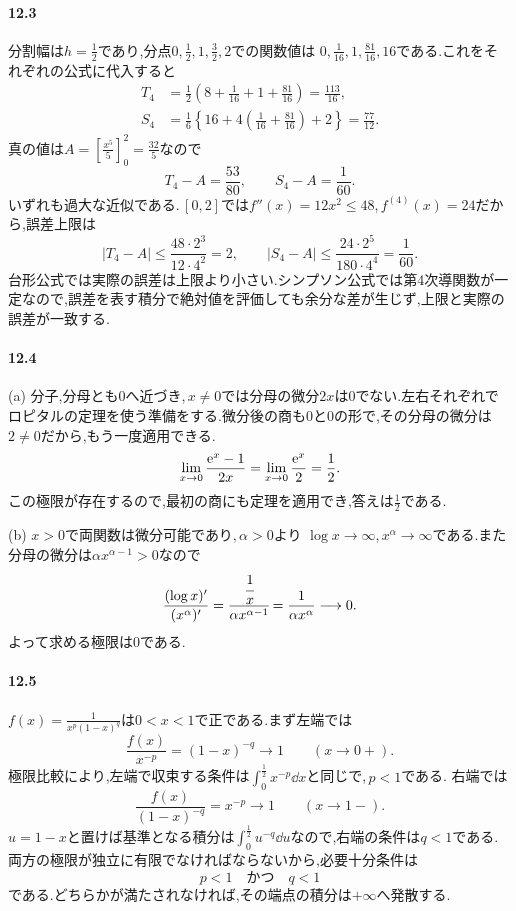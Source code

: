 \paragraph{12.3}
分割幅は$h=\frac12$であり,分点$0,\frac12,1,\frac32,2$での関数値は
$0,\frac1{16},1,\frac{81}{16},16$である.これをそれぞれの公式に代入すると
\[
 \begin{aligned}
 T_4&=\frac12\left(8+\frac1{16}+1+\frac{81}{16}\right)
 =\frac{113}{16},\\
 S_4&=\frac16\left\{16+4\left(\frac1{16}+\frac{81}{16}\right)+2\right\}
 =\frac{77}{12}.
 \end{aligned}
\]
真の値は$A=\left[\frac{x^5}{5}\right]_0^2=\frac{32}{5}$なので
\[
 T_4-A=\frac{53}{80},\qquad S_4-A=\frac1{60}.
\]
いずれも過大な近似である.\,$[0,2]$では$f''(x)=12x^2\le48$,\,$f^{(4)}(x)=24$だから,誤差上限は
\[
 |T_4-A|\le\frac{48\cdot2^3}{12\cdot4^2}=2,
 \qquad
 |S_4-A|\le\frac{24\cdot2^5}{180\cdot4^4}=\frac1{60}.
\]
台形公式では実際の誤差は上限より小さい.シンプソン公式では第4次導関数が一定なので,誤差を表す積分で絶対値を評価しても余分な差が生じず,上限と実際の誤差が一致する.

\paragraph{12.4}
(a) 分子,分母とも$0$へ近づき,\,$x\ne0$では分母の微分$2x$は$0$でない.左右それぞれでロピタルの定理を使う準備をする.微分後の商も$0$と$0$の形で,その分母の微分は$2\ne0$だから,もう一度適用できる.
\[
 \lim_{x\to0}\frac{\mathrm{e}^x-1}{2x}
 =\lim_{x\to0}\frac{\mathrm{e}^x}{2}=\frac12.
\]
この極限が存在するので,最初の商にも定理を適用でき,答えは$\frac12$である.

(b) $x>0$で両関数は微分可能であり,\,$\alpha>0$より
$\log x\to\infty$,\,$x^\alpha\to\infty$である.また分母の微分は$\alpha x^{\alpha-1}>0$なので
\[
 \frac{(\log x)'}{(x^\alpha)'}
 =\cfrac{\cfrac1x}{\alpha x^{\alpha-1}}
 =\frac1{\alpha x^\alpha}\longrightarrow0.
\]
よって求める極限は$0$である.

\paragraph{12.5}
$f(x)=\frac1{x^p(1-x)^q}$は$0<x<1$で正である.まず左端では
\[
 \frac{f(x)}{x^{-p}}=(1-x)^{-q}\longrightarrow1
 \qquad(x\to0+).
\]
極限比較により,左端で収束する条件は$\int_0^{\frac12}x^{-p}\dd x$と同じで,\,$p<1$である.
右端では
\[
 \frac{f(x)}{(1-x)^{-q}}=x^{-p}\longrightarrow1
 \qquad(x\to1-).
\]
$u=1-x$と置けば基準となる積分は$\int_0^{\frac12}u^{-q}\dd u$なので,右端の条件は$q<1$である.
両方の極限が独立に有限でなければならないから,必要十分条件は
\[
 \boxed{p<1\quad\text{かつ}\quad q<1}
\]
である.どちらかが満たされなければ,その端点の積分は$+\infty$へ発散する.

